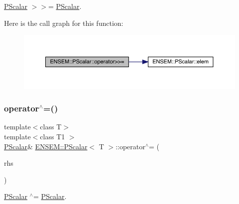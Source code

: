 \mbox{\hyperlink{classENSEM_1_1PScalar}{P\+Scalar}} $>$$>$= \mbox{\hyperlink{classENSEM_1_1PScalar}{P\+Scalar}}. 

Here is the call graph for this function\+:
\nopagebreak
\begin{figure}[H]
\begin{center}
\leavevmode
\includegraphics[width=350pt]{d3/d27/classENSEM_1_1PScalar_a8fe07cd0462ddff9e3d0858ebe29e77c_cgraph}
\end{center}
\end{figure}
\mbox{\label{classENSEM_1_1PScalar_a3f256371cc925f01209559addfcbb632}} 
\subsubsection{\texorpdfstring{operator$^\wedge$=()}{operator^=()}\hspace{0.1cm}{\footnotesize\ttfamily [1/3]}}
{\footnotesize\ttfamily template$<$class T$>$ \\
template$<$class T1 $>$ \\
\mbox{\hyperlink{classENSEM_1_1PScalar}{P\+Scalar}}\& \mbox{\hyperlink{classENSEM_1_1PScalar}{E\+N\+S\+E\+M\+::\+P\+Scalar}}$<$ T $>$\+::operator$^\wedge$= (\begin{DoxyParamCaption}\item[{const \mbox{\hyperlink{classENSEM_1_1PScalar}{P\+Scalar}}$<$ T1 $>$ \&}]{rhs }\end{DoxyParamCaption})\hspace{0.3cm}{\ttfamily [inline]}}



\mbox{\hyperlink{classENSEM_1_1PScalar}{P\+Scalar}} $^\wedge$= \mbox{\hyperlink{classENSEM_1_1PScalar}{P\+Scalar}}. 

